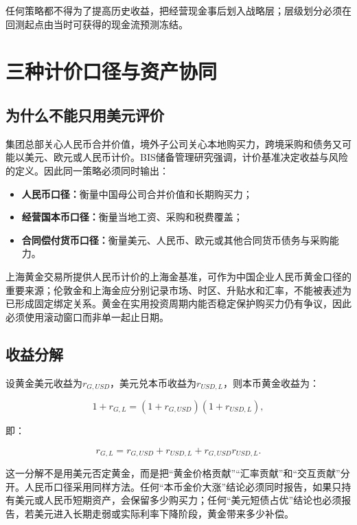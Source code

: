 \documentclass[UTF8,fontset=windows,12pt,openany]{ctexbook}
\begin{document}
任何策略都不得为了提高历史收益，把经营现金事后划入战略层；层级划分必须在回测起点由当时可获得的现金流预测冻结。

\chapter{三种计价口径与资产协同}

\section{为什么不能只用美元评价}

集团总部关心人民币合并价值，境外子公司关心本地购买力，跨境采购和债务又可能以美元、欧元或人民币计价。BIS储备管理研究强调，计价基准决定收益与风险的定义\cite{bisnumeraire}。因此同一策略必须同时输出：

\begin{itemize}
  \item \textbf{人民币口径：}衡量中国母公司合并价值和长期购买力；
  \item \textbf{经营国本币口径：}衡量当地工资、采购和税费覆盖；
  \item \textbf{合同偿付货币口径：}衡量美元、人民币、欧元或其他合同货币债务与采购能力。
\end{itemize}

上海黄金交易所提供人民币计价的上海金基准\cite{sgebenchmark}，可作为中国企业人民币黄金口径的重要来源；伦敦金和上海金应分别记录市场、时区、升贴水和汇率，不能被表述为已形成固定绑定关系。黄金在实用投资周期内能否稳定保护购买力仍有争议\cite{erbharvey}，因此必须使用滚动窗口而非单一起止日期。

\section{收益分解}

设黄金美元收益为\(r_{G,USD}\)，美元兑本币收益为\(r_{USD,L}\)，则本币黄金收益为：

\begin{equation}
1+r_{G,L}=(1+r_{G,USD})(1+r_{USD,L}),
\end{equation}

即：

\begin{equation}
r_{G,L}=r_{G,USD}+r_{USD,L}+r_{G,USD}r_{USD,L}.
\end{equation}

这一分解不是用美元否定黄金，而是把“黄金价格贡献”“汇率贡献”和“交互贡献”分开。人民币口径采用同样方法。任何“本币金价大涨”结论必须同时报告，如果只持有美元或人民币短期资产，会保留多少购买力；任何“美元短债占优”结论也必须报告，若美元进入长期走弱或实际利率下降阶段，黄金带来多少补偿。
\end{document}
